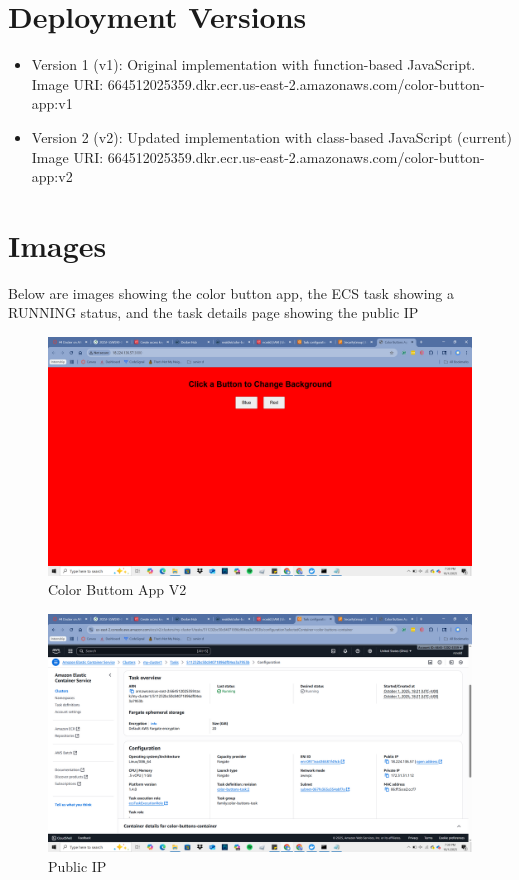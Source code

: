 \section{Deployment Versions}
\begin{itemize}
    \item Version 1 (v1): Original implementation with function-based JavaScript.
    \\ Image URI: 664512025359.dkr.ecr.us-east-2.amazonaws.com/color-button-app:v1
    \item Version 2 (v2): Updated implementation with class-based JavaScript (current)
    \\Image URI: 664512025359.dkr.ecr.us-east-2.amazonaws.com/color-button-app:v2
    
\end{itemize}

\section{Images}

Below are images showing the color button app, the ECS task showing a RUNNING status, and the task details page showing the public IP
\begin{figure}
    \centering
    \includegraphics[width=0.6\linewidth]{Book_SSW590_1/eps/Screenshots/NewColorButton.png}
    \caption{Color Buttom App V2}
    \label{fig:Color Buttom App V2}
\end{figure}

\begin{figure}
    \centering
    \includegraphics[width=0.6\linewidth]{Book_SSW590_1/eps/Screenshots/PublicIP.png}
    \caption{Public IP}
    \label{fig:Public IP}
\end{figure}

